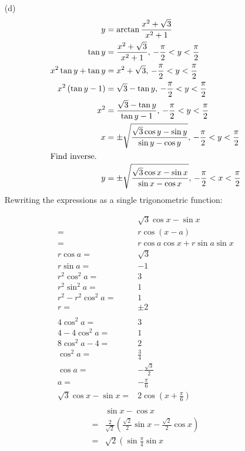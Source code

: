 \documentclass{article}
\begin{document}
\begin{itemize}
\item[(d)]
	\begin{align*}
		y&=\arctan\frac{x^2+\sqrt{3}}{x^2+1} \\
		\tan y&=\frac{x^2+\sqrt{3}}{x^2+1},\,
			-\frac{\pi}{2}<y<\frac{\pi}{2} \\
		x^2\tan y+\tan y&=x^2+\sqrt{3},\,
			-\frac{\pi}{2}<y<\frac{\pi}{2} \\
		x^2\left(\tan y-1\right)&=\sqrt{3}-\tan y,\,
			-\frac{\pi}{2}<y<\frac{\pi}{2} \\
		x^2&=\frac{\sqrt{3}-\tan y}{\tan y-1},\,
			-\frac{\pi}{2}<y<\frac{\pi}{2} \\
		x&=\pm\sqrt{\frac{\sqrt{3}\cos y-\sin y}{\sin y-\cos y}},\,
			-\frac{\pi}{2}<y<\frac{\pi}{2} \\
		\intertext{Find inverse.}
		y&=\pm\sqrt{\frac{\sqrt{3}\cos x-\sin x}{\sin x-\cos x}},\,
			-\frac{\pi}{2}<x<\frac{\pi}{2}
	\end{align*}
	Rewriting the expressions as a single trigonometric function:
	\begin{multicols}{2}
	\begin{align*}
		&\sqrt{3}\cos x-\sin x \\
		=&r\cos\left(x-a\right) \\
		=&r\cos a\cos x+r\sin a\sin x \\
		r\cos a=&\sqrt{3} \\
		r\sin a=&-1 \\
		r^2\cos^2a=&3 \\
		r^2\sin^2a=&1 \\
		r^2-r^2\cos^2a=&1 \\
		r=&\pm2 \\
		\\
		4\cos^2a=&3 \\
		4-4\cos^2a=&1 \\
		8\cos^2a-4=&2 \\
		\cos^2a=&\frac{3}{4} \\
		\cos a=&-\frac{\sqrt{3}}{2} \\
		a=&-\frac{\pi}{6} \\
		\sqrt{3}\cos x-\sin x=&2\cos\left(x+\frac{\pi}{6}\right) \\
	\end{align*}
	\vfill\null\columnbreak
	\begin{align*}
		&\sin x-\cos x \\
		=&\frac{2}{\sqrt{2}}\left(\frac{\sqrt{2}}{2}\sin x
			-\frac{\sqrt{2}}{2}\cos x\right) \\
		=&\sqrt{2}\left(\sin\frac{\pi}{4}\sin x

\end{align*}
\end{multicols}
\end{itemize}
\end{document}
